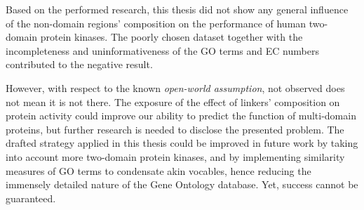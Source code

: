 \label{conclusion}

Based on the performed research, this thesis did not show any general influence of the
non-domain regions' composition on the performance of human two-domain protein kinases.
The poorly chosen dataset together with the incompleteness and uninformativeness of the
GO terms and EC numbers contributed to the negative result.

However, with respect to the known \emph{open-world assumption}, not observed does not
mean it is not there.
The exposure of the effect of linkers' composition on protein activity could improve our
ability to predict the function of multi-domain proteins, but further research is needed
to disclose the presented problem.
The drafted strategy applied in this thesis could be improved in future work by taking
into account more two-domain protein kinases, and by implementing similarity measures of
GO terms to condensate akin vocables, hence reducing the immensely detailed nature of the
Gene Ontology database.
Yet, success cannot be guaranteed.

